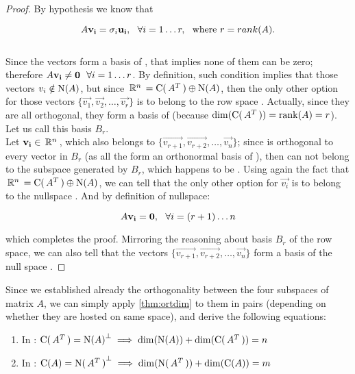 \begin{proof}
By hypothesis we know that 

\[
A\mathbf{v_i} = \sigma_i\mathbf{u_i}, \,\,\,\,\forall i=1 \dots r, \,\,\,\,\text{where
} r = rank(A).
\]
\\

Since the vectors  form a basis of , that
implies none of them can be zero; therefore $A\mathbf{v_i} \ne \mathbf{0}
\,\,\,\,\forall i=1 \dots r$. By definition, such condition implies that
those vectors $v_i \notin \operatorname{N}(A)$, but since $\,\mathbb{R}^{n}\, = \operatorname{C}(\,{A}^{T}\,) \oplus \operatorname{N}(A)$,
then the only other option for those vectors
$\{\vec{v_1},\vec{v_2},\dots,\vec{v_r}\}$ is to belong to the row
space . Actually, since they are all orthogonal, they form
a basis of  (because $\operatorname{dim}(\operatorname{C}(\,{A}^{T}\,)) = \operatorname{rank}(A) =
r$). Let us call this basis $B_r$. \\

Let $\mathbf{v_i} \in \,\mathbb{R}^{n}\,$, which also belongs to
$\{\vec{v_{r+1}},\vec{v_{r+2}},\dots,\vec{v_n}\}$; since 
is orthogonal to every vector in $B_r$ (as all the 
form an orthonormal basis of ), then  can not belong
to the subspace generated by $B_r$, which happens to be
. Using again the fact that $\,\mathbb{R}^{n}\, = \operatorname{C}(\,{A}^{T}\,) \oplus
\operatorname{N}(A)$, we can tell that the only other option for $\vec{v_i}$ is to
belong to the nullspace . And by definition of nullspace:

\[
A\mathbf{v_i} = \mathbf{0}, \,\,\,\,\forall i=(r+1) \dots n
\]
\hfill

which completes the proof. Mirroring the reasoning about basis $B_r$
of the row space, we can also tell that the vectors
$\{\vec{v_{r+1}},\vec{v_{r+2}},\dots,\vec{v_n}\}$ form a basis of the
null space . 
\end{proof}

Since we established already the orthogonality between the four
subspaces of matrix $A$, we can simply apply \cref{thm:ortdim}
to them in pairs (depending on whether they are hosted on same space),
and derive the following equations: \\

\begin{enumerate}
\item In : $\operatorname{C}(\,{A}^{T}\,) = {\operatorname{N}(A)}^{\bot} \implies
  \operatorname{dim}(\operatorname{N}(A)) + \operatorname{dim}(\operatorname{C}(\,{A}^{T}\,)) = n$
\item In : $\operatorname{C}(A) = {\operatorname{N}(\,{A}^{T}\,)}^{\bot} \implies 
  \operatorname{dim}(\operatorname{N}(\,{A}^{T}\,)) + \operatorname{dim}(\operatorname{C}(A)) = m$
\end{enumerate}
\hfill

